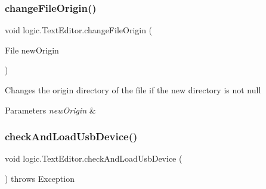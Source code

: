 \subsubsection{\texorpdfstring{change\+File\+Origin()}{changeFileOrigin()}}
{\footnotesize\ttfamily void logic.\+Text\+Editor.\+change\+File\+Origin (\begin{DoxyParamCaption}\item[{File}]{new\+Origin }\end{DoxyParamCaption})\hspace{0.3cm}{\ttfamily [private]}}

Changes the origin directory of the file if the new directory is not null 
\begin{DoxyParams}{Parameters}
{\em new\+Origin} & \\
\hline
\end{DoxyParams}
\mbox{\label{classlogic_1_1_text_editor_aa70bd7664e38609c8a3697ecb39795b5}} 
\subsubsection{\texorpdfstring{check\+And\+Load\+Usb\+Device()}{checkAndLoadUsbDevice()}}
{\footnotesize\ttfamily void logic.\+Text\+Editor.\+check\+And\+Load\+Usb\+Device (\begin{DoxyParamCaption}{ }\end{DoxyParamCaption}) throws Exception\hspace{0.3cm}{\ttfamily [private]}}

